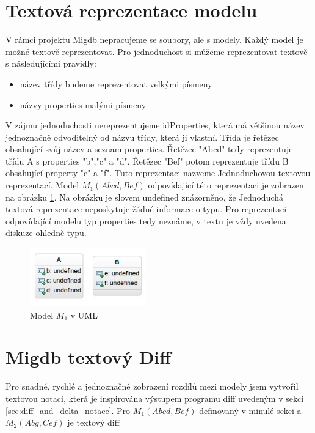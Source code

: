 \documentclass[11pt,twoside,a4paper]{book}
\begin{document}
\section{Textová reprezentace modelu}
V rámci projektu Migdb nepracujeme se soubory, ale s modely. Každý model je
možné textově reprezentovat. Pro jednoduchost si můžeme reprezentovat
textově s následujícími pravidly:
\begin{itemize}
  \item název třídy budeme reprezentovat velkými písmeny
  \item názvy properties malými písmeny
\end{itemize}
 V zájmu jednoduchosti nereprezentujeme idProperties, která má většinou název
 jednoznačně odvoditelný od názvu třídy, která ji vlastní. Třída je řetězec
 obsahující svůj název a seznam properties. Řetězec "Abcd" tedy reprezentuje
 třídu A s properties "b","c" a "d". Řetězec "Bef" potom reprezentuje třídu B
 obsahující property "e" a "f". Tuto reprezentaci nazveme Jednoduchovou 
 textovou reprezentací. Model $M_1(Abcd, Bef)$ odpovídající této reprezentaci
 je zobrazen na obrázku \ref{fig:basic_text_repre}. Na obrázku je slovem
 undefined znázorněno, že Jednoduchá textová reprezentace neposkytuje žádné
 informace o typu. Pro reprezentaci odpovídající modelu typ properties
 tedy neznáme, v textu je vždy uvedena diskuze ohledně typu.
 
 \begin{figure}[H]
\begin{center}
\includegraphics[width=5cm]{figures/basic_text_notation_1}
\caption{Model $M_1$ v UML}
\label{fig:basic_text_repre}
\end{center}
\end{figure}

\FloatBarrier
 
 \section{Migdb textový Diff}\label{sec:migdb_diff}
 Pro snadné, rychlé a jednoznačné zobrazení rozdílů mezi modely jsem vytvořil
 textovou notaci, která je inspirována výstupem programu diff uvedeným v sekci
 \ref{sec:diff_and_delta_notace}. Pro $M_1(Abcd, Bef)$ definovaný v minulé sekci
 a $M_2(Abg, Cef)$ je textový diff
 
\end{document}
